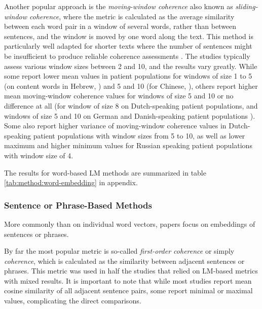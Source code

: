 Another popular approach is the \textit{moving-window coherence} also known as \textit{sliding-window coherence}, where the metric is calculated as the average similarity between each word pair in a window of several words, rather than between sentences, and the window is moved by one word along the text. This method is particularly well adapted for shorter texts where the number of sentences might be insufficient to produce reliable coherence assessments \citep{panicheva2019semantic}. The studies typically assess various window sizes between 2 and 10, and the results vary greatly. While some report lower mean values in patient populations for windows of size 1 to 5 (on content words in Hebrew, \cite{bar2019semantic}) and 5 and 10 (for Chinese, \cite{parola2022speech}), others report higher mean moving-window coherence values for windows of size 5 and 10 \cite{alonso2022language, alonso2022progressive} or no difference at all (for window of size 8 on Dutch-speaking patient populations, \cite{dore2019quantification} and windows of size 5 and 10 on German and Danish-speaking patient populations \cite{parola2022speech}). Some also report higher variance of moving-window coherence values in Dutch-speaking patient populations \citep{voppel2021quantified, voppel2023semantic} with window sizes from 5 to 10, as well as lower maximum and higher minimum values for Russian speaking patient populations \citep{panicheva2019semantic} with window size of 4. 

The results for word-based LM methods are summarized in table \ref{tab:method:word-embedding} in appendix.

\subsubsection{Sentence or Phrase-Based Methods}

More commonly than on individual word vectors, papers focus on embeddings of sentences or phrases. 


By far the most popular metric is so-called \textit{first-order coherence} or simply \textit{coherence}, which is calculated as the similarity between adjacent sentences or phrases. This metric was used in half the studies that relied on LM-based metrics with mixed results. It is important to note that while most studies report mean cosine similarity of all adjacent sentence pairs, some report minimal or maximal values, complicating the direct comparisons.

